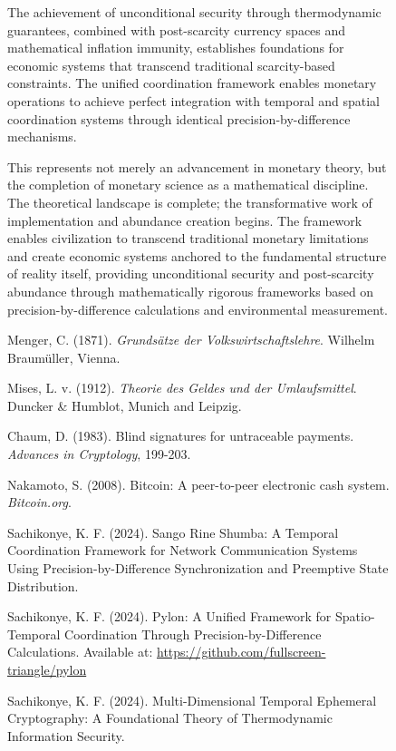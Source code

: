 \documentclass[12pt,a4paper]{article}
\begin{document}
\begin{figure}[H]
The achievement of unconditional security through thermodynamic guarantees, combined with post-scarcity currency spaces and mathematical inflation immunity, establishes foundations for economic systems that transcend traditional scarcity-based constraints. The unified coordination framework enables monetary operations to achieve perfect integration with temporal and spatial coordination systems through identical precision-by-difference mechanisms.

This represents not merely an advancement in monetary theory, but the completion of monetary science as a mathematical discipline. The theoretical landscape is complete; the transformative work of implementation and abundance creation begins. The framework enables civilization to transcend traditional monetary limitations and create economic systems anchored to the fundamental structure of reality itself, providing unconditional security and post-scarcity abundance through mathematically rigorous frameworks based on precision-by-difference calculations and environmental measurement.


\begin{thebibliography}{99}

 Menger, C. (1871). \textit{Grundsätze der Volkswirtschaftslehre}. Wilhelm Braumüller, Vienna.

 Mises, L. v. (1912). \textit{Theorie des Geldes und der Umlaufsmittel}. Duncker \& Humblot, Munich and Leipzig.

 Chaum, D. (1983). Blind signatures for untraceable payments. \textit{Advances in Cryptology}, 199-203.

 Nakamoto, S. (2008). Bitcoin: A peer-to-peer electronic cash system. \textit{Bitcoin.org}.

 Sachikonye, K. F. (2024). Sango Rine Shumba: A Temporal Coordination Framework for Network Communication Systems Using Precision-by-Difference Synchronization and Preemptive State Distribution.

 Sachikonye, K. F. (2024). Pylon: A Unified Framework for Spatio-Temporal Coordination Through Precision-by-Difference Calculations. Available at: \url{https://github.com/fullscreen-triangle/pylon}

 Sachikonye, K. F. (2024). Multi-Dimensional Temporal Ephemeral Cryptography: A Foundational Theory of Thermodynamic Information Security.


\end{thebibliography}
\end{figure}
\end{document}

